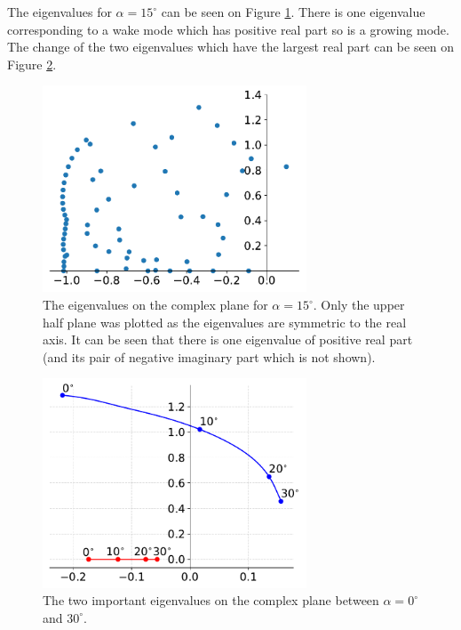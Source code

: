 \documentclass[12pt, a4paper]{article}
\begin{document}
        The eigenvalues for $\alpha = 15^\circ$ can be seen on Figure \ref{fig:eigenvalues}. There is one eigenvalue corresponding to a wake mode which has positive real part so is a growing mode. The change of the two eigenvalues which have the largest real part can be seen on Figure \ref{fig:eigenvalue_change}.
        \begin{figure}[htbp]
            \centering
            \includegraphics[width=0.7\textwidth]{sValues}
            \caption{The eigenvalues on the complex plane for $\alpha = 15^\circ$. Only the upper half plane was plotted as the eigenvalues are symmetric to the real axis. It can be seen that there is one eigenvalue of positive real part (and its pair of negative imaginary part which is not shown).}
            \label{fig:eigenvalues}
        \end{figure}
        \begin{figure}[htbp]
            \centering
            \includegraphics[width=0.7\textwidth]{maxS}
            \caption{The two important eigenvalues on the complex plane between $\alpha = 0^\circ$ and $30^\circ$.}
            \label{fig:eigenvalue_change}
        \end{figure}
        
\end{document}
